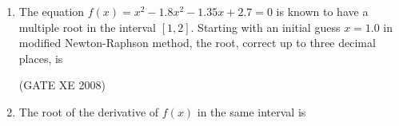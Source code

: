 \documentclass[12pt]{article}
\begin{document}
\begin{enumerate}
\begin{enumerate}
\end{enumerate}

(GATE XE 2008)
\\
\\
\noindent \textbf{\large Linked Answer Questions: Q31 to Q34 carry two marks each.}

\textbf{Statement for Linked Answer Questions 31 and 32:}

A modified Newton-Raphson method is used to find the roots of an equation $f(x)= 0$ which has multiple zeros at some point $x = p$ in the interval $[a,b]$. If the multiplicity $M$ of the root is known in advance, an iterative procedure for determining $p$ is given by \newline \\
$p_{k+1} = p_{k} - M\frac{f(p_{k})}{f'(p_{k})}$ for $k=0,1,2,...$
\\
\item  The equation $f(x)=x^2-1.8x^2 -1.35x+2.7= 0$ is known to have a multiple root in the
interval $[1,2]$. Starting with an initial guess $x =1.0$ in modified Newton-Raphson method, the root, correct up to three decimal places, is

\begin{enumerate}
\end{enumerate}

(GATE XE 2008)

\item The root of the derivative of $f(x)$ in the same interval is

\begin{enumerate}
\end{enumerate}


\end{enumerate}
\end{document}
